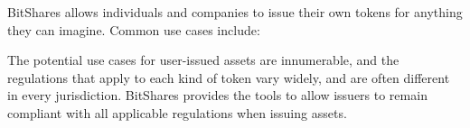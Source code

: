 BitShares allows individuals and companies to issue their own tokens for
anything they can imagine. Common use cases include:

The potential use cases for user-issued assets are innumerable, and the
regulations that apply to each kind of token vary widely, and are often
different in every jurisdiction. BitShares provides the tools to allow
issuers to remain compliant with all applicable regulations when issuing
assets.

